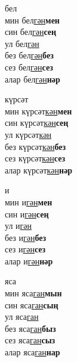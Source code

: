 \begin{multicols}{4}
\begin{enumerate}
\begin{minipage}{\linewidth}
    \item
    бел\\
    мин бел\underline{гән}\textbf{мен}\\
    син бел\underline{гән}\textbf{сең}\\
    ул бел\underline{гән}\\
    без бел\underline{гән}\textbf{без}\\
    сез бел\underline{гән}\textbf{сез}\\
    алар бел\underline{гән}\textbf{нәр}\\
\end{minipage}

\begin{minipage}{\linewidth}
    \item
    күрсәт\\
    мин күрсәт\underline{кән}\textbf{мен}\\
    син күрсәт\underline{кән}\textbf{сең}\\
    ул күрсәт\underline{кән}\\
    без күрсәт\underline{кән}\textbf{без}\\
    сез күрсәт\underline{кән}\textbf{сез}\\
    алар күрсәт\underline{кән}\textbf{нәр}\\
\end{minipage}

\begin{minipage}{\linewidth}
    \item
    и\\
    мин и\underline{гән}\textbf{мен}\\
    син и\underline{гән}\textbf{сең}\\
    ул и\underline{гән}\\
    без и\underline{гән}\textbf{без}\\
    сез и\underline{гән}\textbf{сез}\\
    алар и\underline{гән}\textbf{нәр}\\
\end{minipage}

\begin{minipage}{\linewidth}
    \item
    яса\\
    мин яса\underline{ган}\textbf{мын}\\
    син яса\underline{ган}\textbf{сың}\\
    ул яса\underline{ган}\\
    без яса\underline{ган}\textbf{быз}\\
    сез яса\underline{ган}\textbf{сыз}\\
    алар яса\underline{ган}\textbf{нар}\\
\end{minipage}


\end{enumerate}
\end{multicols}
